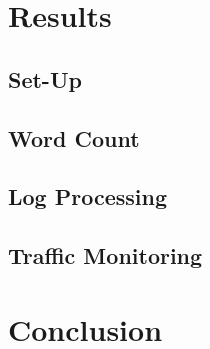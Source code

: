 \documentclass[ppgc,diss,english]{iiufrgs}
\begin{document}
\chapter{Results}

\section{Set-Up}


\section{Word Count}
\section{Log Processing}
\section{Traffic Monitoring}



\chapter{Conclusion}






\end{document}
